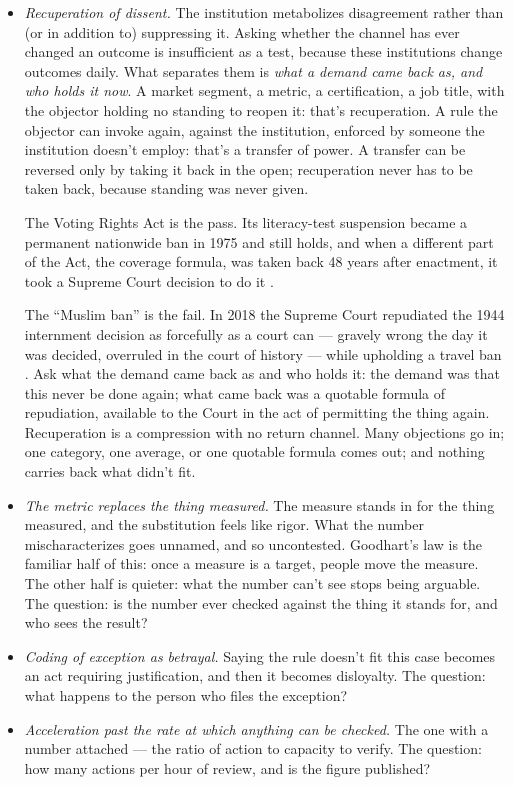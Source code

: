 \begin{itemize}
\item \emph{Recuperation of dissent.} The institution metabolizes disagreement rather than (or in addition to) suppressing it. Asking whether the channel has ever changed an outcome is insufficient as a test, because these institutions change outcomes daily. What separates them is \emph{what a demand came back as, and who holds it now}. A market segment, a metric, a certification, a job title, with the objector holding no standing to reopen it: that's recuperation. A rule the objector can invoke again, against the institution, enforced by someone the institution doesn't employ: that's a transfer of power. A transfer can be reversed only by taking it back in the open; recuperation never has to be taken back, because standing was never given.

The Voting Rights Act is the pass. Its literacy-test suspension became a permanent nationwide ban in 1975 and still holds, and when a different part of the Act, the coverage formula, was taken back 48 years after enactment, it took a Supreme Court decision to do it \autocite{shelby2013}.

The “Muslim ban” is the fail. In 2018 the Supreme Court repudiated the 1944 internment decision as forcefully as a court can — gravely wrong the day it was decided, overruled in the court of history — while upholding a travel ban \autocite{trump2018hawaii,korematsu1944}. Ask what the demand came back as and who holds it: the demand was that this never be done again; what came back was a quotable formula of repudiation, available to the Court in the act of permitting the thing again. Recuperation is a compression with no return channel. Many objections go in; one category, one average, or one quotable formula comes out; and nothing carries back what didn't fit.
\item \emph{The metric replaces the thing measured.} The measure stands in for the thing measured, and the substitution feels like rigor. What the number mischaracterizes goes unnamed, and so uncontested. Goodhart's law is the familiar half of this: once a measure is a target, people move the measure. The other half is quieter: what the number can't see stops being arguable. The question: is the number ever checked against the thing it stands for, and who sees the result?
\item \emph{Coding of exception as betrayal.} Saying the rule doesn't fit this case becomes an act requiring justification, and then it becomes disloyalty. The question: what happens to the person who files the exception?
\item \emph{Acceleration past the rate at which anything can be checked.} The one with a number attached — the ratio of action to capacity to verify. The question: how many actions per hour of review, and is the figure published?
\end{itemize}

